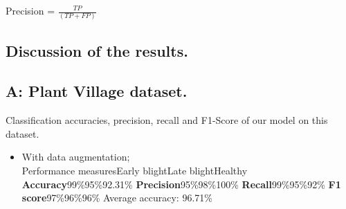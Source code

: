 \documentclass[11pt]{report}
\begin{document}
Precision = $\frac{TP}{(TP + FP)}$


\subsection{Discussion of the results.}

\subsection*{A: Plant Village dataset.}
Classification accuracies, precision, recall and F1-Score of our model on this dataset.\\

\begin{itemize}
	\item With data augmentation;\\
	Performance measures\hspace{3cm}Early blight\hspace{2cm}Late blight\hspace{2cm}Healthy\\
	\textbf{Accuracy}\hspace{6cm}99\%\hspace{2cm}95\%\hspace{4cm}92.31\%
	\textbf{Precision}\hspace{6cm}95\%\hspace{2.5cm}98\%\hspace{4cm}100\%
	\textbf{Recall}\hspace{6.5cm}99\%\hspace{2.5cm}95\%\hspace{4cm}92\%
	\textbf{F1 score}\hspace{6cm}97\%\hspace{2.5cm}96\%\hspace{4cm}96\%
	Average accuracy: 96.71\%
	
\end{itemize}
\end{document}
